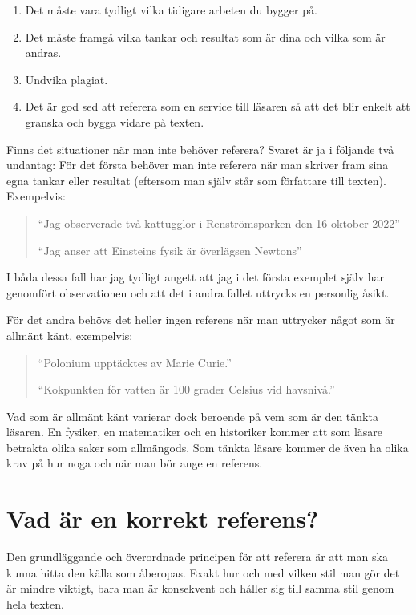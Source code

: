 \documentclass[11pt,a5paper,footinclude=true,headinclude=true]{scrbook} %
\begin{document}
\begin{small}
\begin{enumerate}
\item Det måste vara tydligt vilka tidigare arbeten du bygger på.
\item Det måste framgå vilka tankar och resultat som är dina och vilka som  är andras. 
\item Undvika plagiat.
\item Det är god sed att referera som en service till läsaren så att det blir enkelt att granska och bygga vidare på texten. 
\end{enumerate}
\end{small}

\noindent Finns det situationer när man inte behöver referera? Svaret är ja i följande två undantag: För det första behöver man inte referera när man skriver fram sina egna tankar eller resultat (eftersom man själv står som författare till texten). Exempelvis:

\begin{quote}
``Jag observerade två kattugglor i Renströmsparken den 16 oktober 2022''

``Jag anser att Einsteins fysik är överlägsen Newtons''
\end{quote}

\noindent I båda dessa fall har jag tydligt angett att jag i det första exemplet själv har genomfört observationen och att det i andra fallet uttrycks en personlig åsikt. 

För det andra behövs det heller ingen referens när man uttrycker något som är allmänt känt, exempelvis:

\begin{quote}
``Polonium upptäcktes av Marie Curie.''

``Kokpunkten för vatten är 100 grader Celsius vid havsnivå.''
\end{quote}

\noindent Vad som är allmänt känt varierar dock beroende på vem som är den tänkta läsaren. En fysiker, en matematiker och en historiker kommer att som läsare betrakta olika saker som allmängods. Som tänkta läsare kommer de även ha olika krav på hur noga och när man bör ange en referens. 

\section{Vad är en korrekt referens?}

Den grundläggande och överordnade principen för att referera är att man ska kunna hitta den källa som åberopas. Exakt hur och med vilken stil man gör det är mindre viktigt, bara man är konsekvent och håller sig till samma stil genom hela texten. 
\end{document}
